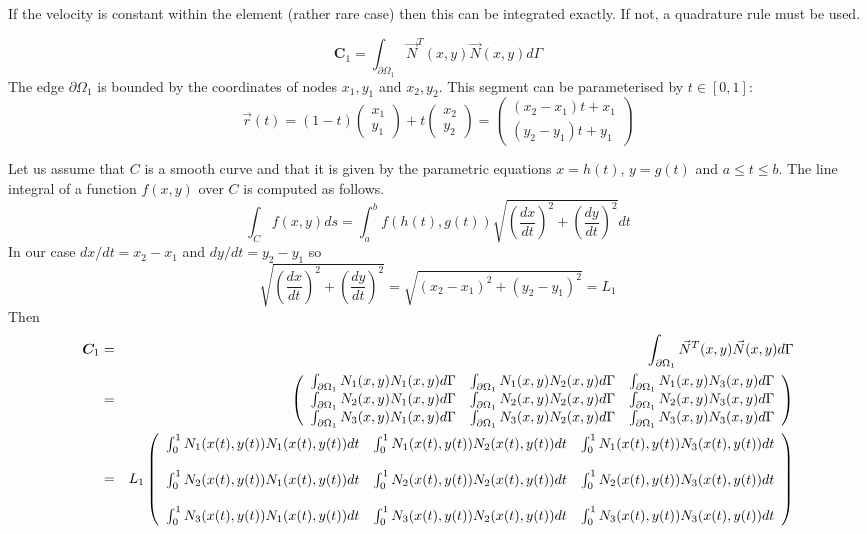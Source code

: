 If the velocity is constant within the element (rather rare case) then this can be integrated exactly.
If not, a quadrature rule must be used. 




\newpage
\[
{\bm C}_1
=\int_{\partial\Omega_1} \vec{N}^T(x,y) \vec{N}(x,y) d\Gamma
\]
The edge $\partial\Omega_1$ is bounded by the coordinates of nodes $x_1,y_1$
and $x_2,y_2$. This segment can be parameterised by $t\in[0,1]$:
\[
\vec{r}(t) = (1-t)\left(\begin{array}{c} x_1 \\ y_1 \end{array} \right) + 
t \left(\begin{array}{c} x_2 \\ y_2 \end{array} \right)
=
\left(\begin{array}{c} (x_2-x_1)t +x_1 \\ (y_2-y_1)t+y_1 \end{array} \right) 
\]

Let us assume that $C$ is a smooth curve and that it is given by the 
parametric equations $x=h(t)$, $y=g(t)$ and $a\leq t \leq b$. The line integral 
of a function $f(x,y)$ over $C$ is computed as follows. 
\[
\int_C f(x,y) ds = \int_a^b f(h(t),g(t)) \sqrt{\left(\frac{dx}{dt}\right)^2 + \left(\frac{dy}{dt}\right)^2} dt
\]
In our case $dx/dt=x_2-x_1$ and $dy/dt=y_2-y_1$ so 
\[
\sqrt{\left(\frac{dx}{dt}\right)^2 + \left(\frac{dy}{dt}\right)^2}
=\sqrt{(x_2-x_1)^2+(y_2-y_1)^2} = L_1
\]
Then 
\begin{eqnarray}
{\bm C}_1
&=&\int_{\partial\Omega_1} \vec{N}^T(x,y) \vec{N}(x,y) d\Gamma \nonumber\\
&=&
\left(
\begin{array}{ccc}
\int_{\partial\Omega_1} N_1(x,y)N_1(x,y) d\Gamma & 
\int_{\partial\Omega_1} N_1(x,y)N_2(x,y) d\Gamma &
\int_{\partial\Omega_1} N_1(x,y)N_3(x,y) d\Gamma \\
\int_{\partial\Omega_1} N_2(x,y)N_1(x,y) d\Gamma & 
\int_{\partial\Omega_1} N_2(x,y)N_2(x,y) d\Gamma &
\int_{\partial\Omega_1} N_2(x,y)N_3(x,y) d\Gamma \\
\int_{\partial\Omega_1} N_3(x,y)N_1(x,y) d\Gamma & 
\int_{\partial\Omega_1} N_3(x,y)N_2(x,y) d\Gamma &
\int_{\partial\Omega_1} N_3(x,y)N_3(x,y) d\Gamma 
\end{array}
\right) \nonumber\\
&=&
L_1
\left(
\begin{array}{ccc}
\int_{0}^1 N_1(x(t),y(t))N_1(x(t),y(t)) dt & 
\int_{0}^1 N_1(x(t),y(t))N_2(x(t),y(t)) dt &
\int_{0}^1 N_1(x(t),y(t))N_3(x(t),y(t)) dt \\\\
\int_{0}^1 N_2(x(t),y(t))N_1(x(t),y(t)) dt & 
\int_{0}^1 N_2(x(t),y(t))N_2(x(t),y(t)) dt &
\int_{0}^1 N_2(x(t),y(t))N_3(x(t),y(t)) dt \\\\
\int_{0}^1 N_3(x(t),y(t))N_1(x(t),y(t)) dt & 
\int_{0}^1 N_3(x(t),y(t))N_2(x(t),y(t)) dt &
\int_{0}^1 N_3(x(t),y(t))N_3(x(t),y(t)) dt
\end{array}
\right) \nonumber\\
\end{eqnarray}


